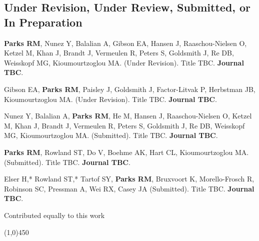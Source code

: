 \subsection*{Under Revision, Under Review, Submitted, or In Preparation}

\noindent \textbf{Parks RM}, Nunez Y, Balalian A,  Gibson EA, Hansen J, Raaschou-Nielsen O, Ketzel M, Khan J, Brandt J, Vermeulen R, Peters S, Goldsmith J, Re DB, Weisskopf MG, Kioumourtzoglou MA. (Under Revision). Title TBC. \textbf{Journal TBC}. \medskip

\noindent Gibson EA, \textbf{Parks RM}, Paisley J, Goldsmith J, Factor-Litvak P, Herbstman JB, Kioumourtzoglou MA. (Under Revision). Title TBC. \textbf{Journal TBC}. \medskip

\noindent Nunez Y, Balalian A, \textbf{Parks RM}, He M, Hansen J, Raaschou-Nielsen O, Ketzel M, Khan J, Brandt J, Vermeulen R, Peters S, Goldsmith J, Re DB, Weisskopf MG, Kioumourtzoglou MA. (Submitted). Title TBC. \textbf{Journal TBC}. \medskip

\noindent \textbf{Parks RM}, Rowland ST, Do V, Boehme AK, Hart CL, Kioumourtzoglou MA. (Submitted). Title TBC. \textbf{Journal TBC}. \medskip

\noindent Elser H,* Rowland ST,* Tartof SY, \textbf{Parks RM}, Bruxvoort K, Morello-Frosch R, Robinson SC, Pressman A, Wei RX, Casey JA (Submitted). Title TBC. \textbf{Journal TBC}. \medskip

\noindent * Contributed equally to this work
											
\begin{center} \line(1,0){450} \end{center}